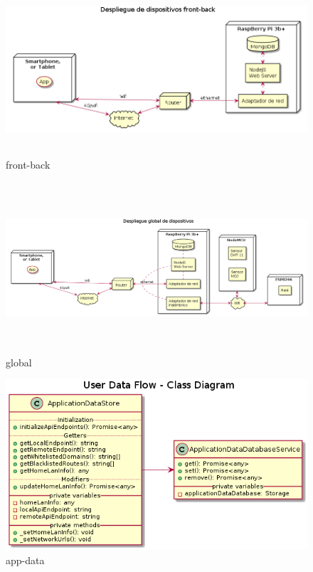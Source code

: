 \begin{figure}[hbt!]
\centering
\includegraphics[height=2.5in]{figures/diagrams/physical-devices/front-back.png}
\caption[front-back]{front-back\footnotemark}
\end{figure}

\begin{figure}[hbt!]
\centering
\includegraphics[height=2.5in]{figures/diagrams/physical-devices/global.png}
\caption[global]{global\footnotemark}
\end{figure}

\begin{figure}[hbt!]
\centering
\includegraphics[height=2.5in]{figures/diagrams/front/data-flow/app-data.png}
\caption[app-data]{app-data\footnotemark}
\end{figure}


